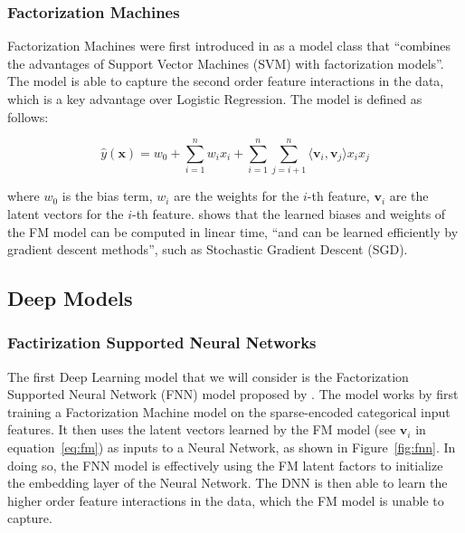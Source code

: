 \documentclass{mldsmsc}
\begin{document}
\subsubsection{Factorization Machines}

Factorization Machines were first introduced in \citep{RefWorks:rendle2010factorization} as
a model class that ``combines the advantages of Support Vector Machines (SVM) with factorization models''.
The model is able to capture the second order feature interactions in the data, which is a key advantage over
Logistic Regression. The model is defined as follows:

\begin{equation}
\label{eq:fm}
\hat{y}(\mathbf{x}) = w_0 + \sum_{i=1}^{n} w_i x_i + \sum_{i=1}^{n} \sum_{j=i+1}^{n} \langle \mathbf{v}_i, \mathbf{v}_j \rangle x_i x_j
\end{equation}

where $w_0$ is the bias term, $w_i$ are the weights for the $i$-th feature, $\mathbf{v}_i$ are the latent vectors for the $i$-th feature.
\cite{RefWorks:rendle2010factorization} shows that the learned biases and weights of the FM model can be
computed in linear time, ``and can be learned efficiently by gradient descent methods'', such as Stochastic Gradient Descent (SGD).


\subsection{Deep Models}

\subsubsection{Factirization Supported Neural Networks}

The first Deep Learning model that we will consider is the Factorization Supported
Neural Network (FNN) model proposed by \cite{RefWorks:zhang2016deep}. The model works by first training a Factorization Machine
model on the sparse-encoded categorical input features. It then uses the latent vectors learned by the FM model (see $\mathbf{v}_i$ in equation~\ref{eq:fm})
as inputs to a Neural Network, as shown in Figure~\ref{fig:fnn}. In doing so, the FNN model is effectively using the FM latent factors to initialize the embedding layer of the Neural Network.
The DNN is then able to learn the higher order feature interactions in the data, which the FM model is unable to capture.
\end{document}
